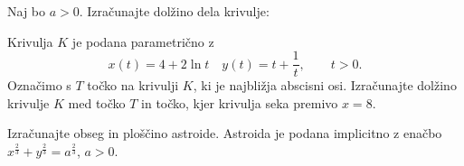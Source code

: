 \documentclass[11pt,a4paper]{exam}
\renewcommand{\leq}{\leqslant} %
\renewcommand{\geq}{\geqslant}
\renewcommand{\{}{\lbrace}
\renewcommand{\}}{\rbrace}
\begin{document}
\begin{questions}
\question 
Naj bo $a > 0$. Izračunajte dolžino dela krivulje:

\question
Krivulja $K$ je podana parametrično z \[x(t) = 4+2 \ln t \quad y(t) = t + \frac{1}{t}, \qquad t > 0.\] Označimo s $T$ točko na krivulji $K$, ki je najbližja abscisni osi. Izračunajte dolžino krivulje $K$ med točko $T$ in točko, kjer krivulja seka premivo $x = 8$.

\question 
Izračunajte obseg in ploščino astroide. Astroida je podana implicitno z enačbo $x^{\frac{2}{3}} + y^{\frac{2}{3}} = a^{\frac{2}{3}}$, $a > 0$.

\end{questions}
\end{document}
